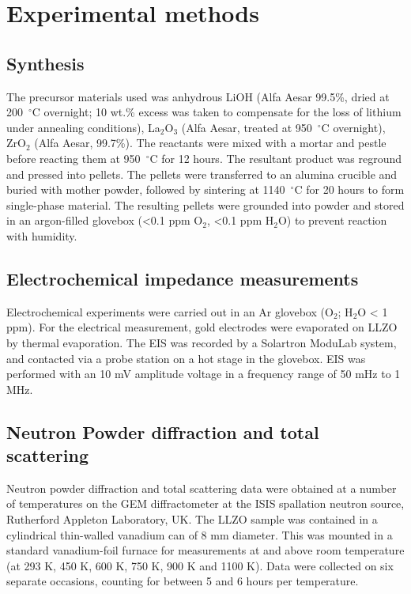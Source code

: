 \documentclass[twoside,twocolumn,9pt]{article}
\begin{document}
\section{Experimental methods}

\subsection{Synthesis}
The precursor materials used was anhydrous LiOH (Alfa Aesar 99.5\%, dried at 200~$^{\circ}$C overnight; 10 wt.\% excess was taken to compensate for the loss of lithium under annealing conditions), La$_2$O$_3$ (Alfa Aesar, treated at 950~$^{\circ}$C overnight), ZrO$_2$ (Alfa Aesar, 99.7\%). The reactants were mixed with a mortar and pestle before reacting them at 950~$^{\circ}$C for 12 hours. The resultant product was reground and pressed into pellets. The pellets were transferred to an alumina crucible and buried with mother powder, followed by sintering at 1140~$^{\circ}$C for 20 hours to form single-phase material. The resulting pellets were grounded into powder and stored in an argon-filled glovebox (<0.1 ppm O$_2$, <0.1 ppm H$_2$O) to prevent reaction with humidity.

\subsection{Electrochemical impedance measurements}

Electrochemical experiments were carried out in an Ar glovebox (O$_2$; H$_2$O < 1 ppm). For the electrical measurement,
gold electrodes were evaporated on LLZO by thermal evaporation. The EIS was recorded by a Solartron ModuLab system,
and contacted via a probe station on a hot stage in the glovebox. EIS was performed with an 10 mV amplitude voltage
in a frequency range of 50 mHz to 1 MHz.

\subsection{Neutron Powder diffraction and total scattering}

Neutron powder diffraction and total scattering data were obtained at a number of temperatures on the GEM diffractometer \cite{Hannon:2005cy} at the
ISIS spallation neutron source, Rutherford Appleton Laboratory, UK. The LLZO sample was contained in a cylindrical thin-walled vanadium can of 8 mm diameter.
This was mounted in a standard vanadium-foil furnace for measurements at and above room temperature (at 293 K, 450 K, 600 K, 750 K,
900 K and 1100 K). Data were collected on six separate occasions, counting for between 5 and 6 hours per temperature.
\end{document}
